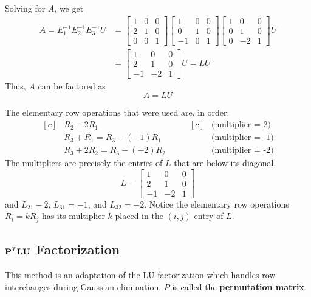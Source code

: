 Solving for $A$, we get
\begin{align*}
    A=E_1^{-1}E_2^{-1}E_3^{-1}U & =\begin{bmatrix}
        1 & 0 & 0 \\
        2 & 1 & 0 \\
        0 & 0 & 1
    \end{bmatrix}\begin{bmatrix}
        1  & 0 & 0 \\
        0  & 1 & 0 \\
        -1 & 0 & 1
    \end{bmatrix}\begin{bmatrix}
        1 & 0  & 0 \\
        0 & 1  & 0 \\
        0 & -2 & 1
    \end{bmatrix}U \\
                                & =\begin{bmatrix}
        1  & 0  & 0 \\
        2  & 1  & 0 \\
        -1 & -2 & 1
    \end{bmatrix}U=LU
\end{align*}
Thus, $A$ can be factored as \[A=LU\]

The elementary row operations that were used are, in order:
\[
    \begin{aligned}[c]
         & R_2-2R_1             \\
         & R_3+R_1=R_3-(-1)R_1  \\
         & R_3+2R_2=R_3-(-2)R_2
    \end{aligned}
    \qquad
    \begin{aligned}[c]
         & \text{(multiplier = 2)}  \\
         & \text{(multiplier = -1)} \\
         & \text{(multiplier = -2)}
    \end{aligned}
\]
The multipliers are precisely the entries of $L$ that are below its diagonal.
\[L=\begin{bmatrix}
        1  & 0  & 0 \\
        2  & 1  & 0 \\
        -1 & -2 & 1
    \end{bmatrix}\]
and $L_{21}-2$, $L_{31}=-1$, and $L_{32}=-2$. Notice the elementary row operations
$R_i=kR_j$ has its multiplier $k$ placed in the $(i,j)$ entry of $L$.

\subsection*{$\mathbf{P}^T\mathbf{LU}$ Factorization}
This method is an adaptation of the LU factorization which handles row interchanges
during Gaussian elimination. $P$ is called the \textbf{permutation matrix}.

